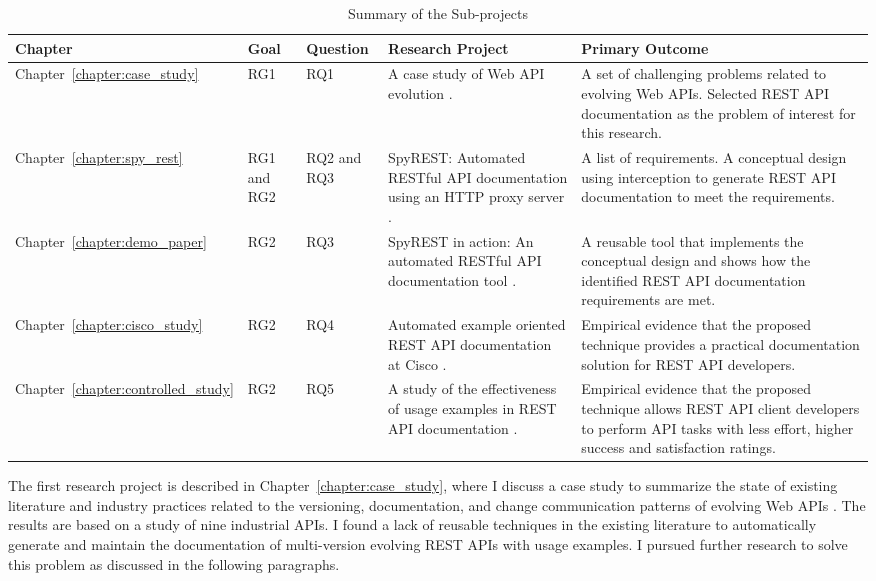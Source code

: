 \begin{table}
  \caption{Summary of the Sub-projects}
  \begin{tabular}{|p{1.5cm}|p{1.5cm}|p{1.5cm}|p{4.5cm}|p{6cm}|}
  \hline
  Chapter & Goal & Question& Research Project & Primary Outcome \\
  \hline
  Chapter~\ref{chapter:case_study}  & RG1 & RQ1 & A case study of Web API evolution \cite{sohan2015case}. & A set of challenging problems related to evolving Web APIs. Selected REST API documentation as the problem of interest for this research. \\
  \hline
  Chapter~\ref{chapter:spy_rest} & RG1 and RG2 & RQ2 and RQ3 & SpyREST: Automated RESTful API documentation using an HTTP proxy server \cite{sohan2015spyrest}. & A list of requirements. A conceptual design using interception to generate REST API documentation to meet the requirements. \\
  \hline
  Chapter~\ref{chapter:demo_paper} & RG2 & RQ3 & SpyREST in action: An automated RESTful API documentation tool \cite{sohan2015spyrest_tool}. & A reusable tool that implements the conceptual design and shows how the identified REST API documentation requirements are met.\\
  \hline
  Chapter~\ref{chapter:cisco_study} & RG2 & RQ4 & Automated example oriented REST API documentation at Cisco \cite{sohan_cisco}. & Empirical evidence that the proposed technique provides a practical documentation solution for REST API developers.\\
  \hline
  Chapter~\ref{chapter:controlled_study} & RG2 & RQ5 & A study of the effectiveness of usage examples in REST API documentation \cite{sohan_vlhcc}. & Empirical evidence that the proposed technique allows REST API client developers to perform API tasks with less effort, higher success and satisfaction ratings.\\
  \hline
\end{tabular}
\label{table:chapter_summary}
\end{table}

The first research project is described in Chapter~\ref{chapter:case_study}, where I discuss a case study to summarize the state of existing literature and industry practices related to the versioning, documentation, and change communication patterns of evolving Web APIs \cite{sohan2015case}. The results are based on a study of nine industrial APIs. I found a lack of reusable techniques in the existing literature to automatically generate and maintain the documentation of multi-version evolving REST APIs with usage examples. I pursued further research to solve this problem as discussed in the following paragraphs.

